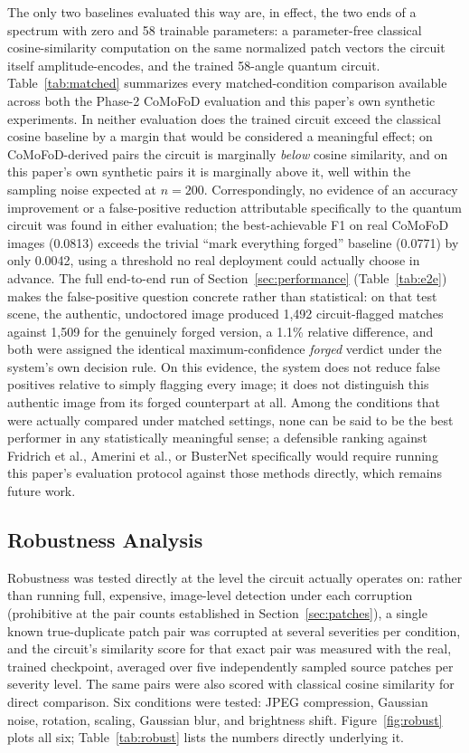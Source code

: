 \documentclass[conference]{IEEEtran}
\begin{document}
The only two baselines evaluated this way are, in effect, the two ends of a spectrum with zero and 58 trainable parameters: a parameter-free classical cosine-similarity computation on the same normalized patch vectors the circuit itself amplitude-encodes, and the trained 58-angle quantum circuit. Table~\ref{tab:matched} summarizes every matched-condition comparison available across both the Phase-2 CoMoFoD evaluation and this paper's own synthetic experiments. In neither evaluation does the trained circuit exceed the classical cosine baseline by a margin that would be considered a meaningful effect; on CoMoFoD-derived pairs the circuit is marginally \emph{below} cosine similarity, and on this paper's own synthetic pairs it is marginally above it, well within the sampling noise expected at $n = 200$. Correspondingly, no evidence of an accuracy improvement or a false-positive reduction attributable specifically to the quantum circuit was found in either evaluation; the best-achievable F1 on real CoMoFoD images (0.0813) exceeds the trivial ``mark everything forged'' baseline (0.0771) by only 0.0042, using a threshold no real deployment could actually choose in advance. The full end-to-end run of Section~\ref{sec:performance} (Table~\ref{tab:e2e}) makes the false-positive question concrete rather than statistical: on that test scene, the authentic, undoctored image produced 1,492 circuit-flagged matches against 1,509 for the genuinely forged version, a 1.1\% relative difference, and both were assigned the identical maximum-confidence \emph{forged} verdict under the system's own decision rule. On this evidence, the system does not reduce false positives relative to simply flagging every image; it does not distinguish this authentic image from its forged counterpart at all. Among the conditions that were actually compared under matched settings, none can be said to be the best performer in any statistically meaningful sense; a defensible ranking against Fridrich et al., Amerini et al., or BusterNet specifically would require running this paper's evaluation protocol against those methods directly, which remains future work.

\subsection{Robustness Analysis}\label{sec:robust}
Robustness was tested directly at the level the circuit actually operates on: rather than running full, expensive, image-level detection under each corruption (prohibitive at the pair counts established in Section~\ref{sec:patches}), a single known true-duplicate patch pair was corrupted at several severities per condition, and the circuit's similarity score for that exact pair was measured with the real, trained checkpoint, averaged over five independently sampled source patches per severity level. The same pairs were also scored with classical cosine similarity for direct comparison. Six conditions were tested: JPEG compression, Gaussian noise, rotation, scaling, Gaussian blur, and brightness shift. Figure~\ref{fig:robust} plots all six; Table~\ref{tab:robust} lists the numbers directly underlying it.
\end{document}
